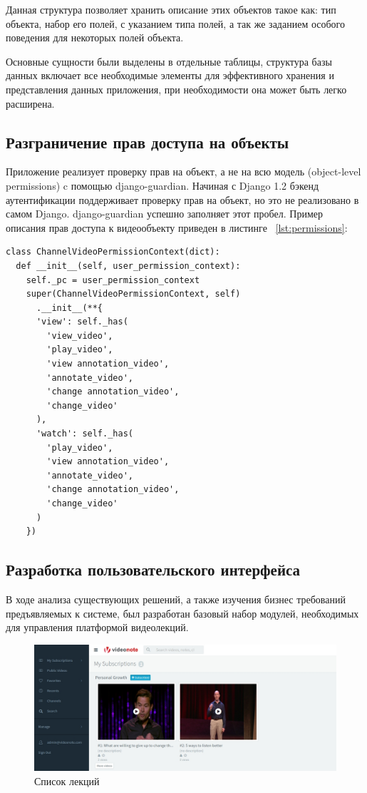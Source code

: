 Данная структура позволяет хранить описание этих объектов такое как: тип объекта,
набор его полей, с указанием типа полей, а так же заданием особого поведения для
некоторых полей объекта.

Основные сущности были выделены в отдельные таблицы, структура базы данных включает
все необходимые элементы для эффективного хранения и представления данных приложения,
при необходимости она может быть легко расширена.

\subsection{Разграничение прав доступа на объекты}

Приложение реализует проверку прав на объект, а не на всю
модель (object-level permissions) c помощью django-guardian. Начиная с Django 1.2 бэкенд
аутентификации поддерживает проверку прав на объект, но это не реализовано в самом Django.
django-guardian успешно заполняет этот пробел. Пример описания прав доступа к видеообъекту
приведен в листинге ~\ref{lst:permissions}:

\FloatBarrier

\begin{lstlisting}[caption={Пример описания прав доступа}, label=lst:permissions]
class ChannelVideoPermissionContext(dict):
  def __init__(self, user_permission_context):
    self._pc = user_permission_context
    super(ChannelVideoPermissionContext, self)
      .__init__(**{
      'view': self._has(
        'view_video',
        'play_video',
        'view annotation_video',
        'annotate_video',
        'change annotation_video',
        'change_video'
      ),
      'watch': self._has(
        'play_video',
        'view annotation_video',
        'annotate_video',
        'change annotation_video',
        'change_video'
      )
    })
\end{lstlisting}

\subsection{Разработка пользовательского интерфейса}

В ходе анализа существующих решений, а также изучения бизнес требований предъявляемых к системе,
был разработан базовый набор модулей, необходимых для управления платформой видеолекций.
\begin{figure}
  \centering
  \includegraphics[width=1\textwidth]{images/user-interface.jpg}
  \caption{Список лекций\label{user-interface}}
\end{figure}

